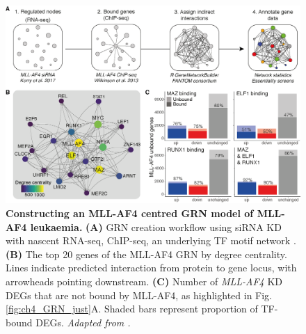\begin{figure}[ht]
    \centering
    \includegraphics[width=\textwidth,height=\textheight,keepaspectratio]{figures/chapter4/ch4_ma4-grn.png}
    \caption[{Constructing an MLL-AF4 centred GRN model of MLL-AF4 leukaemia.}]
    {\textbf{Constructing an MLL-AF4 centred GRN model of MLL-AF4 leukaemia.} 
    \textbf{(A)} GRN creation workflow using siRNA KD with nascent RNA-seq, ChIP-seq, an underlying TF motif network \citep{the_fantom_consortium_and_the_riken_omics_science_center_transcriptional_2009}.
    \textbf{(B)} The top 20 genes of the MLL-AF4 GRN by degree centrality. Lines indicate predicted interaction from protein to gene locus, with arrowheads pointing downstream.
    \textbf{(C)} Number of \textit{MLL-AF4} KD DEGs that are not bound by MLL-AF4, as highlighted in Fig. \ref{fig:ch4_GRN_just}A. Shaded bars represent proportion of TF-bound DEGs. 
    \textit{Adapted from \cite{harman_kmt2a-aff1_2021}.}
    }
    \label{fig:ch4_ma4-grn}
\end{figure}

